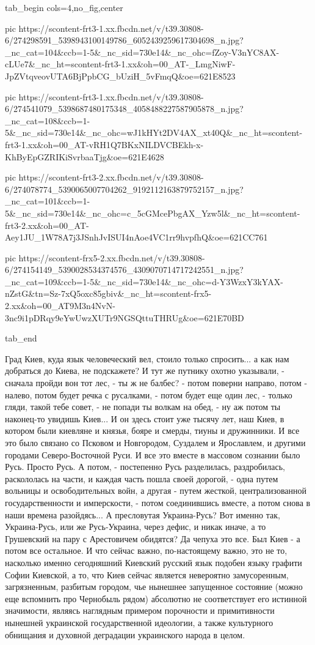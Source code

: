\ifcmt
  tab_begin cols=4,no_fig,center

     pic https://scontent-frt3-1.xx.fbcdn.net/v/t39.30808-6/274298591_5398943100149786_6052439259617304698_n.jpg?_nc_cat=104&ccb=1-5&_nc_sid=730e14&_nc_ohc=fZoy-V3nYC8AX-cLUe7&_nc_ht=scontent-frt3-1.xx&oh=00_AT-_LmgNiwF-JpZVtqveovUTA6BjPpbCG_bUziH_5vFmqQ&oe=621E8523

     pic https://scontent-frt3-1.xx.fbcdn.net/v/t39.30808-6/274541079_5398687480175348_4058488227587905878_n.jpg?_nc_cat=108&ccb=1-5&_nc_sid=730e14&_nc_ohc=wJ1kHYt2DV4AX_xt40Q&_nc_ht=scontent-frt3-1.xx&oh=00_AT-vRH1Q7BKxNILDVCBEkh-x-KhByEpGZRIKiSvrbaaTjg&oe=621E4628

     pic https://scontent-frt3-2.xx.fbcdn.net/v/t39.30808-6/274078774_5390065007704262_9192112163879752157_n.jpg?_nc_cat=101&ccb=1-5&_nc_sid=730e14&_nc_ohc=c_5cGMcePbgAX_Yzw5l&_nc_ht=scontent-frt3-2.xx&oh=00_AT-Aey1JU_1W78A7j3JSnhJvISUI4nAoe4VC1rr9hvpfhQ&oe=621CC761

     pic https://scontent-frx5-2.xx.fbcdn.net/v/t39.30808-6/274154149_5390028534374576_4309070714717242551_n.jpg?_nc_cat=109&ccb=1-5&_nc_sid=730e14&_nc_ohc=d-Y3WzxY3kYAX-nZstG&tn=Sz-7xQ5oxc85gbiv&_nc_ht=scontent-frx5-2.xx&oh=00_AT9M3n4NvN-3nc9i1pDRqy9eYwUwzXUTr9NGSQttuTHRUg&oe=621E70BD

  tab_end
\fi

Град Киев, куда язык
человеческий вел, стоило только спросить...  а как нам добраться до Киева, не
подскажете? И тут же путнику охотно указывали, - сначала пройди вон тот лес, -
ты ж не балбес? - потом поверни направо, потом - налево, потом будет речка с
русалками, - потом будет еще один лес, - только гляди, такой тебе совет, - не
попади ты волкам на обед, - ну аж потом ты наконец-то увидишь Киев...  И он
здесь стоит уже тысячу лет, наш Киев, в котором были киевляне и князья, бояре и
смерды, тиуны и дружинники. И все это было связано со Псковом и Новгородом,
Суздалем и Ярославлем, и другими городами Северо-Восточной Руси.  И все это
вместе в массовом сознании было Русь. Просто Русь. А потом, - постепенно Русь
разделилась, раздробилась, раскололась на части, и каждая часть пошла своей
дорогой, - одна путем вольницы и освободительных войн, а другая - путем
жесткой, централизованной государственности и имперскости, - потом соединившись
вместе, а потом снова в наши времена разойдясь... А пресловутая Украина-Русь?
Вот именно так, Украина-Русь, или же Русь-Украина, через дефис, и никак иначе,
а то Грушевский на пару с Арестовичем обидятся?  Да чепуха это все. Был Киев -
а потом все остальное. И что сейчас важно, по-настоящему важно, это не то,
насколько именно сегодняшний Киевский русский язык подобен языку графити Софии
Киевской, а то, что Киев сейчас является невероятно замусоренным, загрязненным,
разбитым городом, чье нынешнее запущенное состояние (можно еще вспомнить про
Чернобыль рядом) абсолютно не соответствует его истинной значимости, являясь
наглядным примером порочности и примитивности нынешней украинской
государственной идеологии, а также культурного обнищания и духовной деградации
украинского народа в целом.

